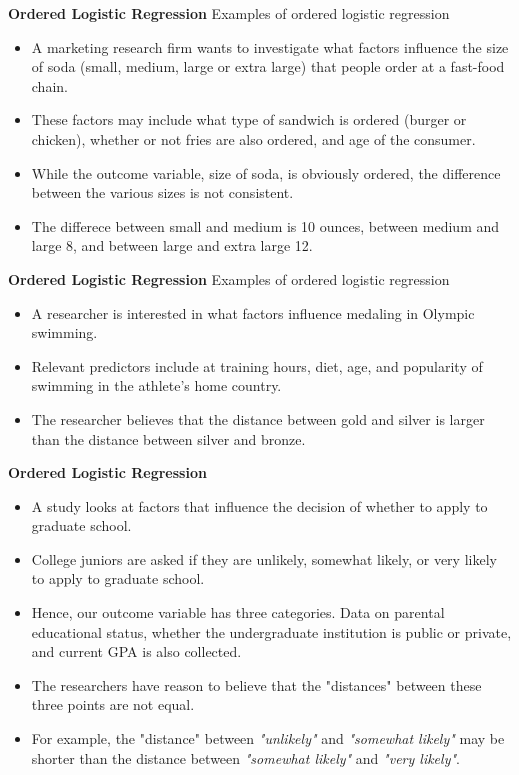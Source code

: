 \documentclass[00-GLMregslides.tex]{subfiles}
\begin{document}
\begin{frame}
\textbf{Ordered Logistic Regression}
Examples of ordered logistic regression
\begin{itemize}
\item A marketing research firm wants to investigate what factors influence the size of soda (small, medium, large or extra large) that 
people order at a fast-food chain. 
\item These factors may include what type of sandwich is ordered (burger or chicken), whether or not fries are also ordered, and age of the consumer. 
\item While the outcome variable, size of soda, is obviously ordered, the difference between the various sizes is not consistent. 
\item The differece between small and medium is 10 ounces, between medium and large 8, and between large and extra large 12.
\end{itemize}
\end{frame}
\begin{frame}
\textbf{Ordered Logistic Regression}
Examples of ordered logistic regression
\begin{itemize}
\item A researcher is interested in what factors influence medaling in Olympic swimming. 
\item Relevant predictors include at training hours, diet, age, and popularity of swimming in the athlete's home country. 
\item The researcher believes that the distance between gold and silver is larger than the distance between silver and bronze.
\end{itemize}
\end{frame}
\begin{frame}
\textbf{Ordered Logistic Regression}

\begin{itemize}
\item 
A study looks at factors that influence the decision of whether to apply to graduate school. 
\item College juniors are asked if they are unlikely, somewhat likely, or very likely to apply to graduate school. 
\item Hence, our outcome variable has three categories. Data on parental educational status, whether the undergraduate institution is public or private, 
and current GPA is also collected. 
\item The researchers have reason to believe that the "distances" between these three points are not equal. 
\item For example, the "distance" between \textit{"unlikely"} and \textit{"somewhat likely"} may be shorter than the distance between \textit{"somewhat likely"} and \textit{"very likely"}.
\end{itemize}
\end{frame}
\end{document}
